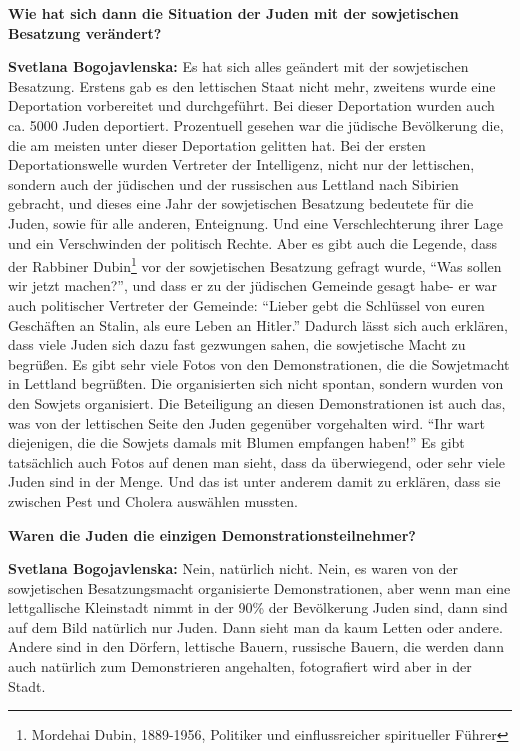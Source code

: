 \textbf{Wie hat sich dann die Situation der Juden mit der sowjetischen Besatzung verändert?}

\textbf{Svetlana Bogojavlenska:} Es hat sich alles geändert mit der sowjetischen Besatzung. Erstens gab es den lettischen Staat nicht mehr, zweitens wurde eine Deportation vorbereitet und durchgeführt. Bei dieser Deportation wurden auch ca. 5000 Juden deportiert. Prozentuell gesehen war die jüdische Bevölkerung die, die am meisten unter dieser Deportation gelitten hat. Bei der ersten Deportationswelle wurden Vertreter der Intelligenz, nicht nur der lettischen, sondern auch der jüdischen und der russischen aus Lettland nach Sibirien gebracht, und dieses eine Jahr der sowjetischen Besatzung bedeutete für die Juden, sowie für alle anderen, Enteignung. Und eine Verschlechterung ihrer Lage und ein Verschwinden der politisch Rechte. 
Aber es gibt auch die Legende, dass der Rabbiner Dubin\footnote{Mordehai Dubin, 1889-1956, Politiker und einflussreicher spiritueller Führer} vor der sowjetischen Besatzung gefragt wurde, "`Was sollen wir jetzt machen?"', und dass er zu der jüdischen Gemeinde gesagt habe- er war auch politischer Vertreter der Gemeinde: "`Lieber gebt die Schlüssel von euren Geschäften an Stalin, als eure Leben an Hitler."' Dadurch lässt sich auch erklären, dass viele Juden sich dazu fast gezwungen sahen, die sowjetische Macht zu begrüßen. Es gibt sehr viele Fotos von den Demonstrationen, die die Sowjetmacht in Lettland begrüßten. Die organisierten sich nicht spontan, sondern wurden von den Sowjets organisiert. Die Beteiligung an diesen Demonstrationen ist auch das, was von der lettischen Seite den Juden gegenüber vorgehalten wird. "`Ihr wart diejenigen, die die Sowjets damals mit Blumen empfangen haben!"' Es gibt tatsächlich auch Fotos auf denen man sieht, dass da überwiegend, oder sehr viele Juden sind in der Menge. Und das ist unter anderem damit zu erklären, dass sie zwischen Pest und Cholera auswählen mussten. 

\textbf{Waren die Juden die einzigen Demonstrationsteilnehmer?}

\textbf{Svetlana Bogojavlenska:} Nein, natürlich nicht. Nein, es waren von der sowjetischen Besatzungsmacht organisierte Demonstrationen, aber wenn man eine lettgallische Kleinstadt nimmt in der 90\% der Bevölkerung Juden sind, dann sind auf dem Bild natürlich nur Juden. Dann sieht man da kaum Letten oder andere. Andere sind in den Dörfern, lettische Bauern, russische Bauern, die werden dann auch natürlich zum Demonstrieren angehalten, fotografiert wird aber in der Stadt.

